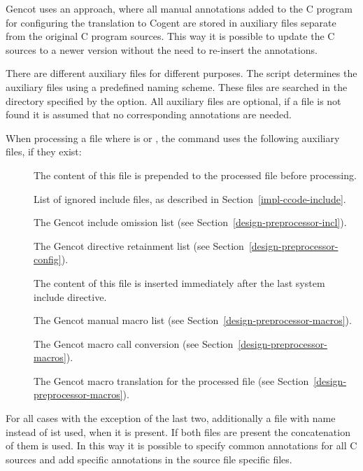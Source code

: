 Gencot uses an approach, where all manual annotations added to the C program for configuring the translation to Cogent 
are stored in auxiliary files separate from the original C program sources. This way it is possible to update the C 
sources to a newer version without the need to re-insert the annotations.

There are different auxiliary files for different purposes. The  script determines the auxiliary files using
a predefined naming scheme. These files are searched in the directory specified by the  option. All auxiliary files
are optional, if a file is not found it is assumed that no corresponding annotations are needed.

When processing a file  where  is  or , the  command uses the 
following auxiliary files, if they exist:
\begin{description}
\item[] The content of this file is prepended to the processed file before processing.
\item[] List of ignored include files, as described in Section~\ref{impl-ccode-include}.
\item[] The Gencot include omission list (see Section~\ref{design-preprocessor-incl}).
\item[] The Gencot directive retainment list (see Section~\ref{design-preprocessor-config}).
\item[] The content of this file is inserted immediately after the last system include directive.
\item[] The Gencot manual macro list (see Section~\ref{design-preprocessor-macros}).
\item[] The Gencot macro call conversion (see Section~\ref{design-preprocessor-macros}).
\item[] The Gencot macro translation for the processed file (see Section~\ref{design-preprocessor-macros}).
\end{description}

For all cases with the exception of the last two, additionally a file with name  instead of  ist used, when it
is present. If both files are present the concatenation of them is used. In this way it is possible to specify common annotations 
for all C sources and add specific annotations in the source file specific files.

